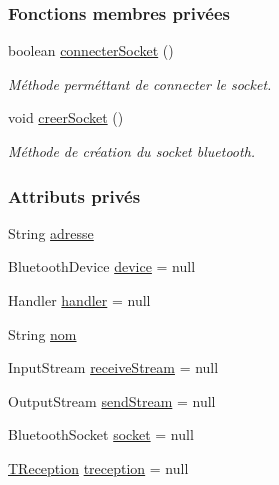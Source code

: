 \subsubsection*{Fonctions membres privées}
\begin{DoxyCompactItemize}
\item 
boolean \hyperlink{classcom_1_1lasalle_1_1io__trucks_1_1_peripherique_a982a4e5a8178b4e9f56e6611fad707ad}{connecter\+Socket} ()
\begin{DoxyCompactList}\small\item\em Méthode perméttant de connecter le socket. \end{DoxyCompactList}\item 
void \hyperlink{classcom_1_1lasalle_1_1io__trucks_1_1_peripherique_a2965bd91f73bf87536e1c743ddc2b76a}{creer\+Socket} ()
\begin{DoxyCompactList}\small\item\em Méthode de création du socket bluetooth. \end{DoxyCompactList}\end{DoxyCompactItemize}
\subsubsection*{Attributs privés}
\begin{DoxyCompactItemize}
\item 
String \hyperlink{classcom_1_1lasalle_1_1io__trucks_1_1_peripherique_a0f0c207b12d3aded58623cfe0f9cd6d2}{adresse}
\item 
Bluetooth\+Device \hyperlink{classcom_1_1lasalle_1_1io__trucks_1_1_peripherique_aa42a263edf31850160d722219115a0ea}{device} = null
\item 
Handler \hyperlink{classcom_1_1lasalle_1_1io__trucks_1_1_peripherique_afc44cb5a50cb29c450ef962efc735532}{handler} = null
\item 
String \hyperlink{classcom_1_1lasalle_1_1io__trucks_1_1_peripherique_a57ad735952307998eddf5277be95ec95}{nom}
\item 
Input\+Stream \hyperlink{classcom_1_1lasalle_1_1io__trucks_1_1_peripherique_aa9909de8df9a7873f63d9e2a3e08772d}{receive\+Stream} = null
\item 
Output\+Stream \hyperlink{classcom_1_1lasalle_1_1io__trucks_1_1_peripherique_a57c51f49b9b0ce3b68a257a96198106b}{send\+Stream} = null
\item 
Bluetooth\+Socket \hyperlink{classcom_1_1lasalle_1_1io__trucks_1_1_peripherique_ac5f2ba9eadd31a1f08f745e68476d238}{socket} = null
\item 
\hyperlink{classcom_1_1lasalle_1_1io__trucks_1_1_peripherique_1_1_t_reception}{T\+Reception} \hyperlink{classcom_1_1lasalle_1_1io__trucks_1_1_peripherique_ac1dde247bc593447515e3d7b3ad73550}{treception} = null
\end{DoxyCompactItemize}
